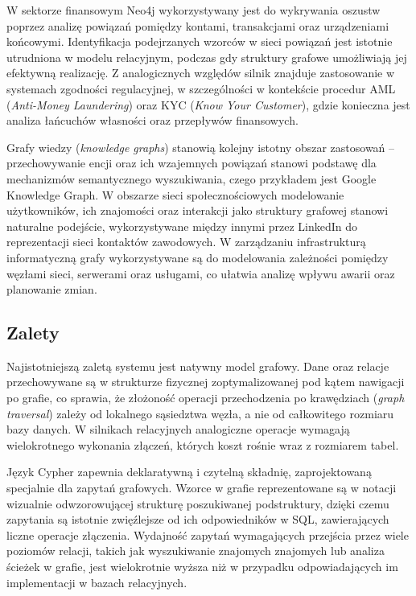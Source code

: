 W sektorze finansowym Neo4j wykorzystywany jest do wykrywania oszustw poprzez
analizę powiązań pomiędzy kontami, transakcjami oraz urządzeniami końcowymi.
Identyfikacja podejrzanych wzorców w sieci powiązań jest istotnie utrudniona
w modelu relacyjnym, podczas gdy struktury grafowe umożliwiają jej efektywną
realizację. Z analogicznych względów silnik znajduje zastosowanie w systemach
zgodności regulacyjnej, w szczególności w kontekście procedur AML
(\textit{Anti-Money Laundering}) oraz KYC (\textit{Know Your Customer}),
gdzie konieczna jest analiza łańcuchów własności oraz przepływów finansowych.

Grafy wiedzy (\textit{knowledge graphs}) stanowią kolejny istotny obszar
zastosowań -- przechowywanie encji oraz ich wzajemnych powiązań stanowi
podstawę dla mechanizmów semantycznego wyszukiwania, czego przykładem
jest Google Knowledge Graph. W obszarze sieci społecznościowych modelowanie
użytkowników, ich znajomości oraz interakcji jako struktury grafowej stanowi
naturalne podejście, wykorzystywane między innymi przez LinkedIn do
reprezentacji sieci kontaktów zawodowych. W zarządzaniu infrastrukturą
informatyczną grafy wykorzystywane są do modelowania zależności pomiędzy
węzłami sieci, serwerami oraz usługami, co ułatwia analizę wpływu awarii
oraz planowanie zmian.

\subsection{Zalety}

Najistotniejszą zaletą systemu jest natywny model grafowy. Dane oraz relacje
przechowywane są w strukturze fizycznej zoptymalizowanej pod kątem nawigacji
po grafie, co sprawia, że złożoność operacji przechodzenia po krawędziach
(\textit{graph traversal}) zależy od lokalnego sąsiedztwa węzła, a nie od
całkowitego rozmiaru bazy danych. W silnikach relacyjnych analogiczne
operacje wymagają wielokrotnego wykonania złączeń, których koszt rośnie
wraz z rozmiarem tabel.

Język Cypher zapewnia deklaratywną i czytelną składnię, zaprojektowaną
specjalnie dla zapytań grafowych. Wzorce w grafie reprezentowane są
w notacji wizualnie odwzorowującej strukturę poszukiwanej podstruktury, dzięki
czemu zapytania są istotnie zwięźlejsze od ich odpowiedników w SQL,
zawierających liczne operacje złączenia. Wydajność zapytań wymagających
przejścia przez wiele poziomów relacji, takich jak wyszukiwanie znajomych
znajomych lub analiza ścieżek w grafie, jest wielokrotnie wyższa niż
w przypadku odpowiadających im implementacji w bazach relacyjnych.

